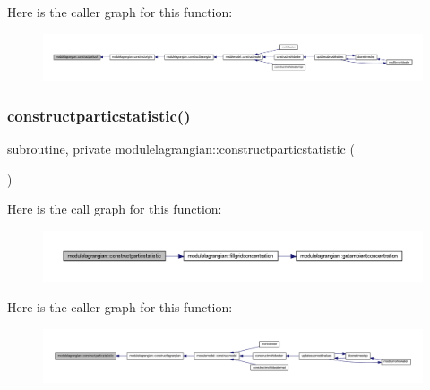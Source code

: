 Here is the caller graph for this function\+:\nopagebreak
\begin{figure}[H]
\begin{center}
\leavevmode
\includegraphics[width=350pt]{namespacemodulelagrangian_a4ded42964190b91fb51481ee647db44a_icgraph}
\end{center}
\end{figure}
\mbox{\label{namespacemodulelagrangian_a9111f92be66d257fc573bf898bbc38d9}} 
\subsubsection{\texorpdfstring{constructparticstatistic()}{constructparticstatistic()}}
{\footnotesize\ttfamily subroutine, private modulelagrangian\+::constructparticstatistic (\begin{DoxyParamCaption}{ }\end{DoxyParamCaption})\hspace{0.3cm}{\ttfamily [private]}}

Here is the call graph for this function\+:\nopagebreak
\begin{figure}[H]
\begin{center}
\leavevmode
\includegraphics[width=350pt]{namespacemodulelagrangian_a9111f92be66d257fc573bf898bbc38d9_cgraph}
\end{center}
\end{figure}
Here is the caller graph for this function\+:\nopagebreak
\begin{figure}[H]
\begin{center}
\leavevmode
\includegraphics[width=350pt]{namespacemodulelagrangian_a9111f92be66d257fc573bf898bbc38d9_icgraph}
\end{center}
\end{figure}
\mbox{\label{namespacemodulelagrangian_a00248d924be257777ce6bdce98029594}} 
